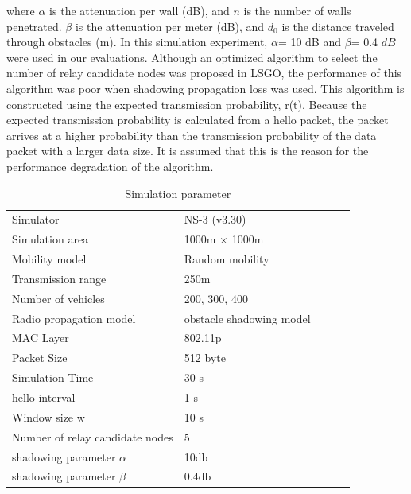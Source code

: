 \documentclass[conference]{IEEEtran}
\begin{document}
where $\alpha$ is the attenuation per wall (dB), and $n$ is the number of walls penetrated. 
$\beta$ is the attenuation per meter (dB), and $d_0$ is the distance traveled through obstacles (m). 
In this simulation experiment, $\alpha$= 10 dB and $\beta$= 0.4 $ dB $ were used in our evaluations. 
Although an optimized algorithm to select the number of relay candidate nodes was proposed in LSGO, the performance of this algorithm was poor when shadowing propagation loss was used. 
This algorithm is constructed using the expected transmission probability, r(t). Because the expected transmission probability is calculated from a hello packet, the packet arrives at a higher probability than the transmission probability of the data packet with a larger data size. It is assumed that this is the reason for the performance degradation of the algorithm. 



\begin{table}[!ht]
\begin{center}
\caption{Simulation parameter}
\label{tab:parameter}
\begin{tabular}{|l|l|lll}
\cline{1-2}
Simulator    & NS-3 (v3.30) &  &  &  \\ \cline{1-2}
Simulation area    & 1000m × 1000m   &  &  &  \\ \cline{1-2}
Mobility model     & Random mobility &  &  &  \\ \cline{1-2}
Transmission range & 250m            &  &  &  \\ \cline{1-2}
Number of vehicles & 200, 300, 400      &  &  &  \\ \cline{1-2}
Radio propagation model    & obstacle shadowing model\cite{20}&  &  &  \\ \cline{1-2}
MAC Layer     & 802.11p &  &  &  \\ \cline{1-2}
Packet Size & 512 byte       &  &  &  \\ \cline{1-2}
Simulation Time & 30 s      &  &  &  \\ \cline{1-2}
hello interval & 1 s      &  &  &  \\ \cline{1-2}
Window size w  & 10 s      &  &  &  \\ \cline{1-2}
Number of relay candidate nodes  & 5       &  &  \\ \cline{1-2}
shadowing parameter $\alpha$  & 10db      &  &  &  \\ \cline{1-2}
shadowing parameter $\beta$    & 0.4db &  &  \\ \cline{1-2}
\end{tabular}
\end{center}
\end{table}
\end{document}
